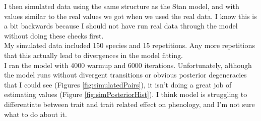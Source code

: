 \documentclass{article}
\begin{document}
I then simulated data using the same structure as the Stan model, and with values similar to the real values we got when we used the real data. I know this is a bit backwards because I should not have run real data through the model without doing these checks first.\\

My simulated data included 150 species and 15 repetitions. Any more repetitions that this actually lead to divergences in the model fitting. \\

I ran the model with 4000 warmup and 6000 iterations. Unfortunately, although the model runs without divergent transitions or obvious posterior degeneracies that I could see (Figures \ref{fig:simulatedPairs}), it isn't doing a great job of estimating values (Figure \ref{fig:simPosteriorHist}). I think model is struggling to differentiate between trait and trait related effect on phenology, and I'm not sure what to do about it. 
\end{document}
